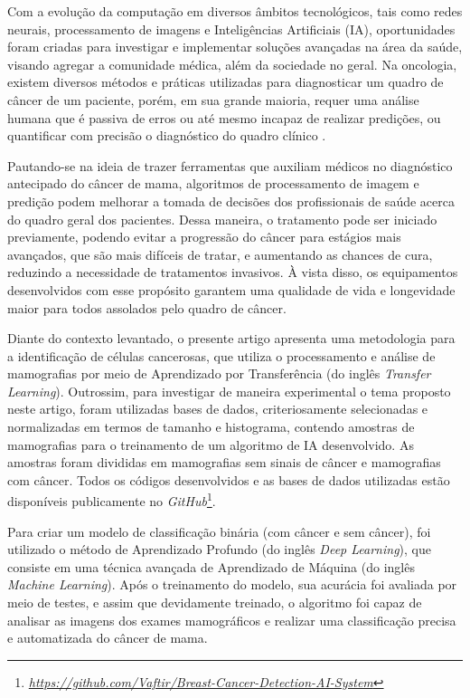 Com a evolução da computação em diversos âmbitos tecnológicos, tais como redes neurais, processamento de imagens e Inteligências Artificiais (IA), oportunidades foram criadas para investigar e implementar soluções avançadas na área da saúde, visando agregar a comunidade médica, além da sociedade no geral. Na oncologia, existem diversos métodos e práticas utilizadas para diagnosticar um quadro de câncer de um paciente, porém, em sua grande maioria, requer uma análise humana que é passiva de erros ou até mesmo incapaz de realizar predições, ou quantificar com precisão o diagnóstico do quadro clínico \cite{parametrization}.

Pautando-se na ideia de trazer ferramentas que auxiliam médicos no diagnóstico antecipado do câncer de mama, algoritmos de processamento de imagem e predição podem melhorar a tomada de decisões dos profissionais de saúde acerca do quadro geral dos pacientes. Dessa maneira, o tratamento pode ser iniciado previamente, podendo evitar a progressão do câncer para estágios mais avançados, que são mais difíceis de tratar, e aumentando as chances de cura, reduzindo a necessidade de tratamentos invasivos. À vista disso, os equipamentos desenvolvidos com esse propósito garantem uma qualidade de vida e longevidade maior para todos assolados pelo quadro de câncer.

Diante do contexto levantado, o presente artigo apresenta uma metodologia para a identificação de células cancerosas, que utiliza o processamento e análise de mamografias por meio de Aprendizado por Transferência (do inglês \textit{Transfer Learning}). Outrossim, para investigar de maneira experimental o tema proposto neste artigo, foram utilizadas bases de dados, criteriosamente selecionadas e normalizadas em termos de tamanho e histograma, contendo amostras de mamografias para o treinamento de um algoritmo de IA desenvolvido. As amostras foram divididas em mamografias sem sinais de câncer e mamografias com câncer. Todos os códigos desenvolvidos e as bases de dados utilizadas estão disponíveis publicamente no \textit{GitHub}\footnote{\href{https://github.com/Vaftir/Breast-Cancer-Detection-AI-System}{\textit{https://github.com/Vaftir/Breast-Cancer-Detection-AI-System}}}.

Para criar um modelo de classificação binária (com câncer e sem câncer), foi utilizado o método de Aprendizado Profundo (do inglês \textit{Deep Learning}), que consiste em uma técnica avançada de Aprendizado de Máquina (do inglês \textit{Machine Learning}). Após o treinamento do modelo, sua acurácia foi avaliada por meio de testes, e assim que devidamente treinado, o algoritmo foi capaz de analisar as imagens dos exames mamográficos e realizar uma classificação precisa e automatizada do câncer de mama.

